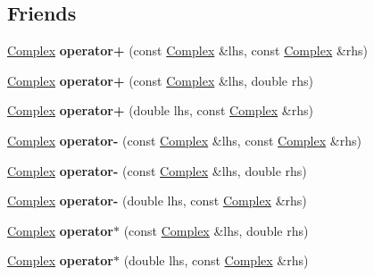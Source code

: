 \subsection*{Friends}
\begin{DoxyCompactItemize}
\item 
\mbox{\label{classComplex_a1e6272806b797c78f0e60b8df9e8b245}} 
\hyperlink{classComplex}{Complex} {\bfseries operator+} (const \hyperlink{classComplex}{Complex} \&lhs, const \hyperlink{classComplex}{Complex} \&rhs)
\item 
\mbox{\label{classComplex_aa515b95c56079a8b076c67b81fa29d8f}} 
\hyperlink{classComplex}{Complex} {\bfseries operator+} (const \hyperlink{classComplex}{Complex} \&lhs, double rhs)
\item 
\mbox{\label{classComplex_a6e253695b765d426941d622528fd1ce2}} 
\hyperlink{classComplex}{Complex} {\bfseries operator+} (double lhs, const \hyperlink{classComplex}{Complex} \&rhs)
\item 
\mbox{\label{classComplex_a505282e00ae5011159bc06603f7e7748}} 
\hyperlink{classComplex}{Complex} {\bfseries operator-\/} (const \hyperlink{classComplex}{Complex} \&lhs, const \hyperlink{classComplex}{Complex} \&rhs)
\item 
\mbox{\label{classComplex_aa35731468ad777bdf42b1b65f6b9a31f}} 
\hyperlink{classComplex}{Complex} {\bfseries operator-\/} (const \hyperlink{classComplex}{Complex} \&lhs, double rhs)
\item 
\mbox{\label{classComplex_a25a8a3b823f6aa69b93a0cd1b911c51b}} 
\hyperlink{classComplex}{Complex} {\bfseries operator-\/} (double lhs, const \hyperlink{classComplex}{Complex} \&rhs)
\item 
\mbox{\label{classComplex_ab57557ea1ebbe8d4e0a63576f692559b}} 
\hyperlink{classComplex}{Complex} {\bfseries operator$\ast$} (const \hyperlink{classComplex}{Complex} \&lhs, double rhs)
\item 
\mbox{\label{classComplex_a9603db869212023c65ec6bcf0d76b428}} 
\hyperlink{classComplex}{Complex} {\bfseries operator$\ast$} (double lhs, const \hyperlink{classComplex}{Complex} \&rhs)

\end{DoxyCompactItemize}
